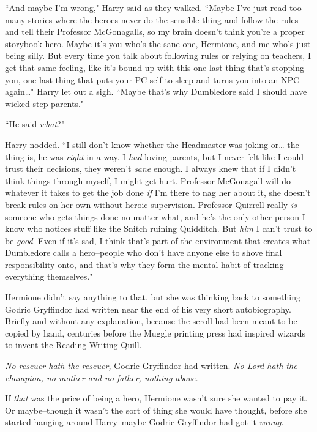 ``And maybe I'm wrong," Harry said as they walked. ``Maybe I've just read too many stories where the heroes never do the sensible thing and follow the rules and tell their Professor McGonagalls, so my brain doesn't think you're a proper storybook hero. Maybe it's you who's the sane one, Hermione, and me who's just being silly. But every time you talk about following rules or relying on teachers, I get that same feeling, like it's bound up with this one last thing that's stopping you, one last thing that puts your PC self to sleep and turns you into an NPC again{\ldots}" Harry let out a sigh. ``Maybe that's why Dumbledore said I should have wicked step-parents."

``He said \emph{what}?"

Harry nodded. ``I still don't know whether the Headmaster was joking or{\ldots} the thing is, he was \emph{right} in a way. I \emph{had} loving parents, but I never felt like I could trust their decisions, they weren't \emph{sane} enough. I always knew that if I didn't think things through myself, I might get hurt. Professor McGonagall will do whatever it takes to get the job done \emph{if} I'm there to nag her about it, she doesn't break rules on her own without heroic supervision. Professor Quirrell really \emph{is} someone who gets things done no matter what, and he's the only other person I know who notices stuff like the Snitch ruining Quidditch. But \emph{him} I can't trust to be \emph{good}. Even if it's sad, I think that's part of the environment that creates what Dumbledore calls a hero\---people who don't have anyone else to shove final responsibility onto, and that's why they form the mental habit of tracking everything themselves."

Hermione didn't say anything to that, but she was thinking back to something Godric Gryffindor had written near the end of his very short autobiography. Briefly and without any explanation, because the scroll had been meant to be copied by hand, centuries before the Muggle printing press had inspired wizards to invent the Reading-Writing Quill.

\emph{No rescuer hath the rescuer,} Godric Gryffindor had written. \emph{No Lord hath the champion, no mother and no father, nothing above.}

If \emph{that} was the price of being a hero, Hermione wasn't sure she wanted to pay it. Or maybe\---though it wasn't the sort of thing she would have thought, before she started hanging around Harry\---maybe Godric Gryffindor had got it \emph{wrong}.

